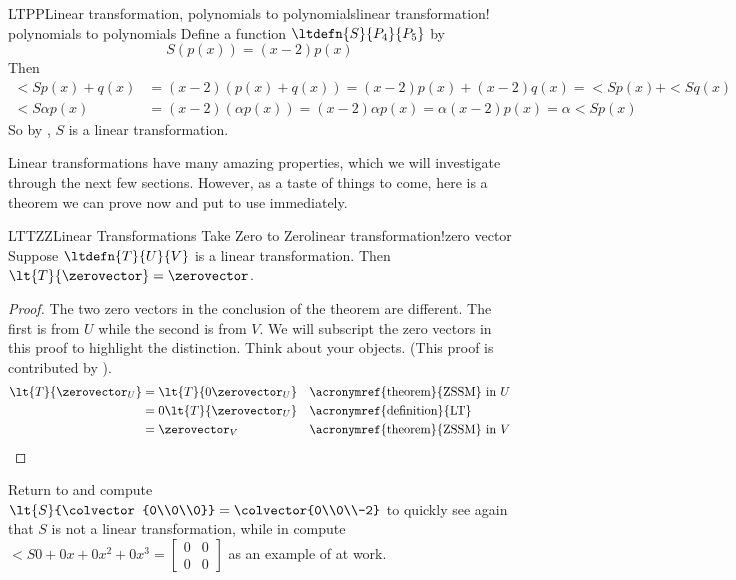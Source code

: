 %
%
\begin{example}{LTPP}{Linear transformation, polynomials to polynomials}{linear transformation! polynomials to polynomials}
Define a function $\ltdefn{S}{P_4}{P_5}$ by
%
\begin{equation*}
S(p(x))=(x-2)p(x)
\end{equation*}
%
Then
%
\begin{align*}
\lt{S}{p(x)+q(x)}&=(x-2)(p(x)+q(x))=(x-2)p(x)+(x-2)q(x)=\lt{S}{p(x)}+\lt{S}{q(x)}\\
\lt{S}{\alpha p(x)}&=(x-2)(\alpha p(x))=(x-2)\alpha p(x)=\alpha(x-2)p(x)=\alpha\lt{S}{p(x)}
\end{align*}
%
So by , $S$ is a linear transformation.
%
\end{example}
%
Linear transformations have many amazing properties, which we will investigate through the next few sections.  However, as a taste of things to come, here is a theorem we can prove now and put to use immediately.
%
\begin{theorem}{LTTZZ}{Linear Transformations Take Zero to Zero}{linear transformation!zero vector}
Suppose $\ltdefn{T}{U}{V}$ is a linear transformation.  Then $\lt{T}{\zerovector}=\zerovector$.
\end{theorem}
%
\begin{proof}
The two zero vectors in the conclusion of the theorem are different.  The first is from $U$ while the second is from $V$.  We will subscript the zero vectors in this proof to highlight the distinction.  Think about your objects.  (This proof is contributed by \markshoemaker).
%
\begin{align*}
\lt{T}{\zerovector_U}
&=\lt{T}{0\zerovector_U}
&&\text{\acronymref{theorem}{ZSSM} in $U$}\\
%
&=0\lt{T}{\zerovector_U}
&&\text{\acronymref{definition}{LT}}\\
%
&=\zerovector_V
&&\text{\acronymref{theorem}{ZSSM} in $V$}
%
\end{align*}
%
\end{proof}
%
Return to  and compute $\lt{S}{\colvector{0\\0\\0}}=\colvector{0\\0\\-2}$ to quickly see again that $S$ is not a linear transformation, while in   compute $\lt{S}{0+0x+0x^2+0x^3}=\begin{bmatrix}0&0\\0&0\end{bmatrix}$ as an example of  at work.
